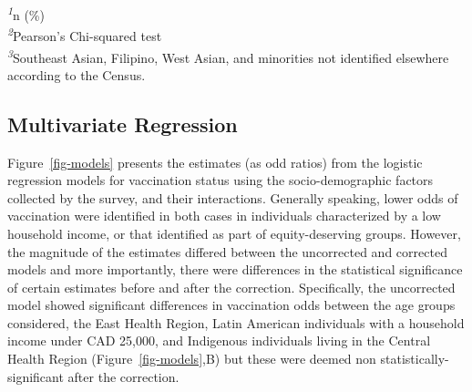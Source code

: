 \documentclass[
  letterpaper,
  DIV=11,
  numbers=noendperiod]{scrartcl}
\begin{document}
\begin{minipage}{\linewidth}
\textsuperscript{\textit{1}}n (\%)\\
\textsuperscript{\textit{2}}Pearson's Chi-squared test\\
\textsuperscript{\textit{3}}Southeast Asian, Filipino, West Asian,
and minorities not identified elsewhere according to the Census.\\
\end{minipage}

\hypertarget{multivariate-regression}{%
\subsection{Multivariate Regression}\label{multivariate-regression}}

Figure~\ref{fig-models} presents the estimates (as odd ratios) from the
logistic regression models for vaccination status using the
socio-demographic factors collected by the survey, and their
interactions. Generally speaking, lower odds of vaccination were
identified in both cases in individuals characterized by a low household
income, or that identified as part of equity-deserving groups. However,
the magnitude of the estimates differed between the uncorrected and
corrected models and more importantly, there were differences in the
statistical significance of certain estimates before and after the
correction. Specifically, the uncorrected model showed significant
differences in vaccination odds between the age groups considered, the
East Health Region, Latin American individuals with a household income
under CAD 25,000, and Indigenous individuals living in the Central
Health Region (Figure~\ref{fig-models},B) but these were deemed non
statistically-significant after the correction.
\end{document}
